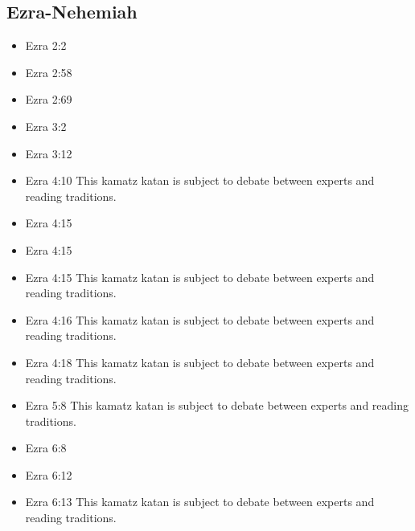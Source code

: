 \documentclass[14pt]{book}
\begin{document}
\subsection{Ezra-Nehemiah}
\begin{multicols}{2}\begin{itemize}
		\item Ezra 2:2
		
		\item Ezra 2:58
		
		\item Ezra 2:69
		
		\item Ezra 3:2
		
		\item Ezra 3:12
		
		\item Ezra 4:10 This kamatz katan is subject to debate between experts and reading traditions.
		
		\item Ezra 4:15
		
		\item Ezra 4:15
		
		\item Ezra 4:15 This kamatz katan is subject to debate between experts and reading traditions.
		
		\item Ezra 4:16 This kamatz katan is subject to debate between experts and reading traditions.
		
		\item Ezra 4:18 This kamatz katan is subject to debate between experts and reading traditions.
		
		\item Ezra 5:8 This kamatz katan is subject to debate between experts and reading traditions.
		
		\item Ezra 6:8
		
		\item Ezra 6:12
		
		\item Ezra 6:13 This kamatz katan is subject to debate between experts and reading traditions.
		

\end{itemize}
\end{multicols}
\end{document}
